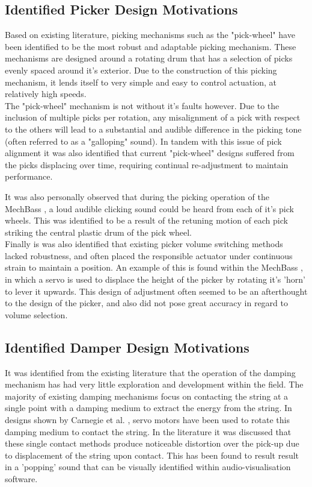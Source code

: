 \documentclass[a4paper,11pt]{article}
\begin{document}
\subsection{Identified Picker Design Motivations}\label{S:motivations_pick}

Based on existing literature, picking mechanisms such as the "pick-wheel" \cite{Carnegie2017} have been identified to be the most robust and adaptable picking mechanism. These mechanisms are designed around a rotating drum that has a selection of picks evenly spaced around it's exterior. Due to the construction of this picking mechanism, it lends itself to very simple and easy to control actuation, at relatively high speeds. \\

The "pick-wheel" mechanism is not without it's faults however. Due to the inclusion of multiple picks per rotation, any misalignment of a pick with respect to the others will lead to a substantial and audible difference in the picking tone (often referred to as a "galloping" sound). In tandem with this issue of pick alignment it was also identified that current "pick-wheel" designs suffered from the picks displacing over time, requiring continual re-adjustment to maintain performance.

It was also personally observed that during the picking operation of the MechBass \cite{McVay2015}, a loud audible clicking sound could be heard from each of it's pick wheels. This was identified to be a result of the retuning motion of each pick striking the central plastic drum of the pick wheel.\\

Finally is was also identified that existing picker volume switching methods lacked robustness, and often placed the responsible actuator under continuous strain to maintain a position. An example of this is found within the MechBass \cite{McVay2015}, in which a servo is used to displace the height of the picker by rotating it's 'horn' to lever it upwards. This design of adjustment often seemed to be an afterthought to the design of the picker, and also did not pose great accuracy in regard to volume selection.


\subsection{Identified Damper Design Motivations}\label{S:motivations_damp}

It was identified from the existing literature that the operation of the damping mechanism has had very little exploration and development within the field. The majority of existing damping mechanisms focus on contacting the string at a single point with a damping medium to extract the energy from the string. In designs shown by Carnegie et al. \cite{Carnegie2017}, servo motors have been used to rotate this damping medium to contact the string. In the literature it was discussed that these single contact methods produce noticeable distortion over the pick-up due to displacement of the string upon contact. This has been found to result result in a 'popping' sound that can be visually identified within audio-visualisation software.\\
\end{document}
